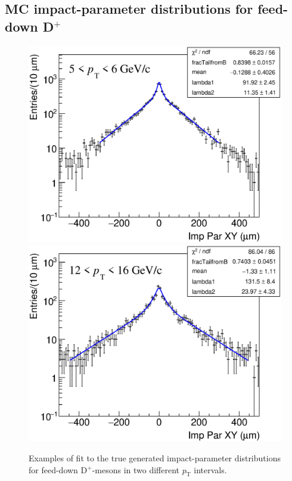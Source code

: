 \documentclass[b5paper,10pt,twoside,oldstyle,classica]{toptesi}
\newcommand{\pt}{p_\text{T}}
\begin{document}
\subsection{MC impact-parameter distributions for feed-down D$^+$}
\begin{figure}[tb]
\begin{center}
{\includegraphics[scale = 0.31]{ImpParTrueFD_5-6.eps}}
\hspace{-0.2cm}
{\includegraphics[scale = 0.31]{ImpParTrueFD_12-16.eps}}
\caption{Examples of fit to the true generated impact-parameter distributions for feed-down D$^+$-mesons in two different $\pt$ intervals.}
\label{trueFD_prefit}
\end{center}
\end{figure}
\end{document}
